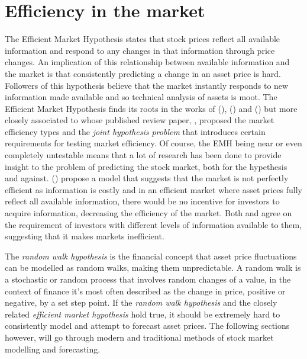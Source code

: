 \section{Efficiency in the market}
The Efficient Market Hypothesis states that stock prices reflect all available information and respond to any changes in that information through price changes. An implication of this relationship between available information and the market is that consistently predicting a change in an asset price is hard. Followers of this hypothesis believe that the market instantly responds to new information made available and so technical analysis of assets is moot. The Efficient Market Hypothesis finds its roots in the works of \citeauthor{bachelier} (\citeyear{bachelier}), \citeauthor{mandelbrot} (\citeyear{mandelbrot}) and \citeauthor{samuelson} (\citeyear{samuelson}) but more closely associated to \citeauthor{fama_efficient_market} whose published review paper, \emph{}, proposed the market efficiency types and the \emph{joint hypothesis problem} that introduces certain requirements for testing market efficiency. Of course, the EMH being near or even completely untestable means that a lot of research has been done to provide insight to the problem of predicting the stock market, both for the hypethesis and against. \citeauthor{grossman-stiglitz} (\citeyear{grossman-stiglitz}) propose a model that suggests that the market is not perfectly efficient as information is costly and in an efficient market where asset prices fully reflect all available information, there would be no incentive for investors to acquire information, decreasing the efficiency of the market. Both \citeauthor{grossman-stiglitz} and \citeauthor{blackEMH} agree on the requirement of investors with different levels of information available to them, suggesting that it makes markets inefficient.

The \emph{random walk hypothesis} is the financial concept that asset price fluctuations can be modelled as random walks, making them unpredictable. A random walk is a stochastic or random process that involves random changes of a value, in the context of finance it's most often described as the change in price, positive or negative, by a set step point. If the \emph{random walk hypothesis} and the closely related \emph{efficient market hypothesis} hold true, it should be extremely hard to consistently model and attempt to forecast asset prices. The following sections however, will go through modern and traditional methods of stock market modelling and forecasting.

